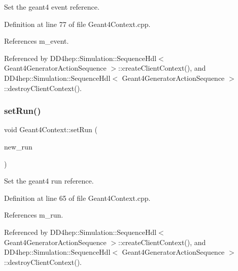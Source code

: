 Set the geant4 event reference. 



Definition at line 77 of file Geant4\+Context.\+cpp.



References m\+\_\+event.



Referenced by D\+D4hep\+::\+Simulation\+::\+Sequence\+Hdl$<$ Geant4\+Generator\+Action\+Sequence $>$\+::create\+Client\+Context(), and D\+D4hep\+::\+Simulation\+::\+Sequence\+Hdl$<$ Geant4\+Generator\+Action\+Sequence $>$\+::destroy\+Client\+Context().

\hypertarget{class_d_d4hep_1_1_simulation_1_1_geant4_context_a31bdc70c285a758ad7563d5c54a5072a}{}\label{class_d_d4hep_1_1_simulation_1_1_geant4_context_a31bdc70c285a758ad7563d5c54a5072a} 
\subsubsection{\texorpdfstring{set\+Run()}{setRun()}}
{\footnotesize\ttfamily void Geant4\+Context\+::set\+Run (\begin{DoxyParamCaption}\item[{\hyperlink{class_d_d4hep_1_1_simulation_1_1_geant4_run}{Geant4\+Run} $\ast$}]{new\+\_\+run }\end{DoxyParamCaption})}



Set the geant4 run reference. 



Definition at line 65 of file Geant4\+Context.\+cpp.



References m\+\_\+run.



Referenced by D\+D4hep\+::\+Simulation\+::\+Sequence\+Hdl$<$ Geant4\+Generator\+Action\+Sequence $>$\+::create\+Client\+Context(), and D\+D4hep\+::\+Simulation\+::\+Sequence\+Hdl$<$ Geant4\+Generator\+Action\+Sequence $>$\+::destroy\+Client\+Context().

\hypertarget{class_d_d4hep_1_1_simulation_1_1_geant4_context_a00a85304b9e0f665406a051d08ec07e9}{}\label{class_d_d4hep_1_1_simulation_1_1_geant4_context_a00a85304b9e0f665406a051d08ec07e9} 
